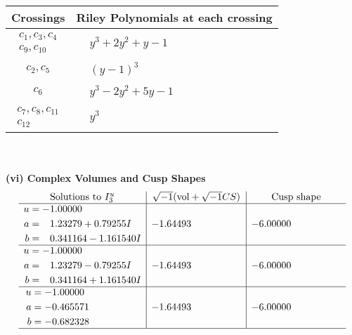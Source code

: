 \documentclass[1p]{elsarticle_modified}
\theoremstyle{definition}
\newcommand{\I}{\sqrt{-1}}
\begin{document}
\begin{tabular}{m{50pt}|m{274pt}}
Crossings & \hspace{64pt}Riley Polynomials at each crossing \\
\hline $$\begin{aligned}c_{1},c_{3},c_{4}\\c_{9},c_{10}\end{aligned}$$&$\begin{aligned}
&y^3+2 y^2+y-1
\end{aligned}$\\
\hline $$\begin{aligned}c_{2},c_{5}\end{aligned}$$&$\begin{aligned}
&(y-1)^3
\end{aligned}$\\
\hline $$\begin{aligned}c_{6}\end{aligned}$$&$\begin{aligned}
&y^3-2 y^2+5 y-1
\end{aligned}$\\
\hline $$\begin{aligned}c_{7},c_{8},c_{11}\\c_{12}\end{aligned}$$&$\begin{aligned}
&y^3
\end{aligned}$\\
\hline
\end{tabular}\\~\\
\newpage\flushleft \textbf{(vi) Complex Volumes and Cusp Shapes}
$$\begin{array}{c|c|c}  
\text{Solutions to }I^u_{3}& \I (\text{vol} + \sqrt{-1}CS) & \text{Cusp shape}\\
 \hline 
\begin{aligned}
u &= -1.00000\phantom{ +0.000000I} \\
a &= \phantom{-}1.23279 + 0.79255 I \\
b &= \phantom{-}0.341164 - 1.161540 I\end{aligned}
 & -1.64493\phantom{ +0.000000I} & -6.00000\phantom{ +0.000000I} \\ \hline\begin{aligned}
u &= -1.00000\phantom{ +0.000000I} \\
a &= \phantom{-}1.23279 - 0.79255 I \\
b &= \phantom{-}0.341164 + 1.161540 I\end{aligned}
 & -1.64493\phantom{ +0.000000I} & -6.00000\phantom{ +0.000000I} \\ \hline\begin{aligned}
u &= -1.00000\phantom{ +0.000000I} \\
a &= -0.465571\phantom{ +0.000000I} \\
b &= -0.682328\phantom{ +0.000000I}\end{aligned}
 & -1.64493\phantom{ +0.000000I} & -6.00000\phantom{ +0.000000I}\\
 \hline 
 \end{array}$$\newpage\newpage\renewcommand{\arraystretch}{1}
\end{document}
